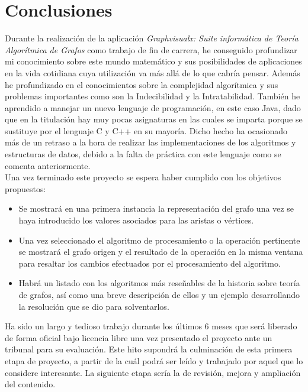\chapter{Conclusiones}
\label{chap:conclusiones}

Durante la realización de la aplicación \emph{Graphvisualx: Suite informática de Teoría Algorítmica de Grafos} como trabajo de fin de carrera, he conseguido profundizar mi conocimiento sobre este mundo matemático y sus posibilidades de aplicaciones en la vida cotidiana cuya utilización va más allá de lo que cabría pensar. Además he profundizado en el conocimientos sobre la complejidad algorítmica y sus problemas importantes como son la Indecibilidad y la Intratabilidad. También he aprendido a manejar un nuevo lenguaje de programación, en este caso Java, dado que en la titulación hay muy pocas asignaturas en las cuales se imparta porque se sustituye por el lenguaje C y C++ en su mayoría. Dicho hecho ha ocasionado más de un retraso a la hora de realizar las implementaciones de los algoritmos y estructuras de datos, debido a la falta de práctica con este lenguaje como se comenta anteriormente.\\

Una vez terminado este proyecto se espera haber cumplido con los objetivos propuestos:
\begin{itemize}
\item Se mostrará en una primera instancia la representación del grafo una vez se haya introducido los valores asociados para las aristas o vértices.

\item Una vez seleccionado el algoritmo de procesamiento o la operación pertinente se mostrará el grafo origen y el resultado de la operación en la misma ventana para resaltar los cambios efectuados por el procesamiento del algoritmo.

\item Habrá un listado con los algoritmos más reseñables de la historia sobre teoría de grafos, así como una breve descripción de ellos y un ejemplo desarrollando la resolución que se dio para solventarlos. 

\end{itemize}

Ha sido un largo y tedioso trabajo durante los últimos 6 meses que será liberado de forma oficial bajo licencia libre una vez presentado el proyecto ante un tribunal para su evaluación. Este hito supondrá la culminación de esta primera etapa de proyecto, a partir de la cuál podrá ser leído y trabajado por aquel que lo considere interesante. La siguiente etapa sería la de revisión, mejora y ampliación del contenido.\\

